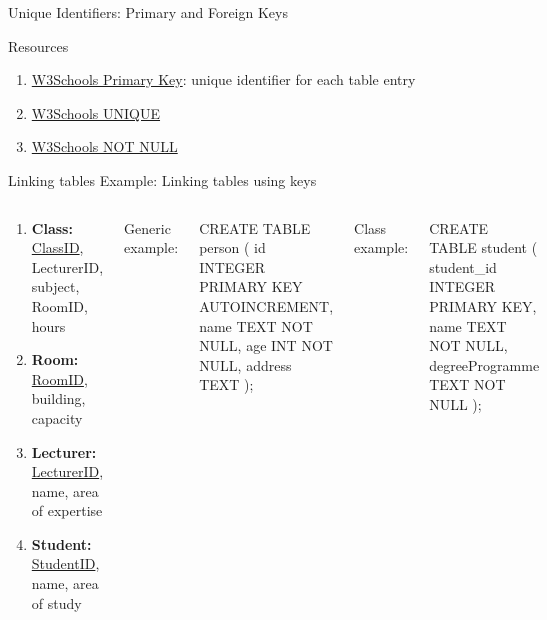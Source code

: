 \begin{frame}{Unique Identifiers: Primary and Foreign Keys}
\begin{alertblock}{Resources}
  \begin{enumerate}\footnotesize
      \item \href{https://www.w3schools.com/sql/sql_primarykey.asp}{W3Schools Primary Key}: unique identifier for each table entry
      \item \href{https://www.w3schools.com/sql/sql_unique.asp}{W3Schools UNIQUE}
      \item \href{https://www.w3schools.com/sql/sql_notnull.asp}{W3Schools NOT NULL}
  \end{enumerate}
\end{alertblock}

\end{frame}

\begin{frame}[fragile]{Linking tables}
  Example: Linking tables using keys \bigskip 
\small 
\begin{columns}
    \begin{block}{}
        \begin{enumerate}
            \item \textbf{Class:} \underline{ClassID}, LecturerID, subject, RoomID, hours
            \item \textbf{Room:} \underline{RoomID}, building, capacity
            \item \textbf{Lecturer:} \underline{LecturerID}, name, area of expertise
            \item \textbf{Student:} \underline{StudentID}, name, area of study
        \end{enumerate}
      \end{block}
Generic example:
\begin{sqlcode}
CREATE TABLE person (
   id      INTEGER PRIMARY KEY AUTOINCREMENT,
   name    TEXT   NOT NULL,
   age     INT    NOT NULL,
   address TEXT
);
\end{sqlcode}

Class example:
\begin{sqlcode}
CREATE TABLE student (
   student_id      INTEGER PRIMARY KEY,
   name            TEXT    NOT NULL,
   degreeProgramme TEXT    NOT NULL
);
\end{sqlcode}
\end{columns}
\end{frame}


